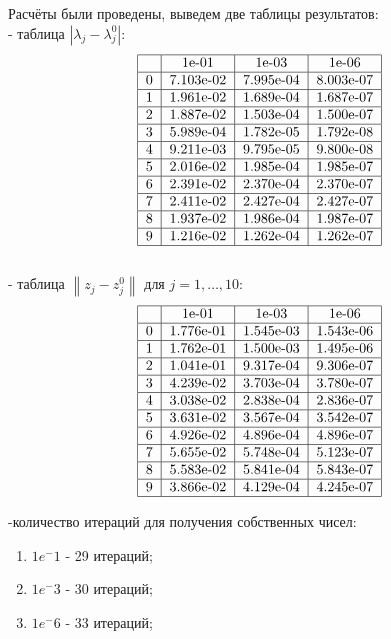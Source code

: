 \documentclass[a4paper]{article}
\begin{document}
\begin{small}

Расчёты были проведены, выведем две таблицы результатов: \\
- таблица $\left | \lambda_j - \lambda_j^{0}  \right |$:
\begin{equation*}
\begin{tabular}{|c|c|c|c|}
\hline
{} &      1e-01 &      1e-03 &      1e-06 \\
\hline
0 &  7.103e-02 &  7.995e-04 &  8.003e-07 \\
\hline
1 &  1.961e-02 &  1.689e-04 &  1.687e-07 \\
\hline
2 &  1.887e-02 &  1.503e-04 &  1.500e-07 \\
\hline
3 &  5.989e-04 &  1.782e-05 &  1.792e-08 \\
\hline
4 &  9.211e-03 &  9.795e-05 &  9.800e-08 \\
\hline
5 &  2.016e-02 &  1.985e-04 &  1.985e-07 \\
\hline
6 &  2.391e-02 &  2.370e-04 &  2.370e-07 \\
\hline
7 &  2.411e-02 &  2.427e-04 &  2.427e-07 \\
\hline
8 &  1.937e-02 &  1.986e-04 &  1.987e-07 \\
\hline
9 &  1.216e-02 &  1.262e-04 &  1.262e-07 \\
\hline
\end{tabular}
\end{equation*}
\\
- таблица $\left \| z_j - z_j^{0} \right \|$  для $j = 1,\ldots,10$:
\begin{equation*}
\begin{tabular}{|c|c|c|c|}
\hline
{} &      1e-01 &      1e-03 &      1e-06 \\
\hline
0 &  1.776e-01 &  1.545e-03 &  1.543e-06 \\
\hline
1 &  1.762e-01 &  1.500e-03 &  1.495e-06 \\
\hline
2 &  1.041e-01 &  9.317e-04 &  9.306e-07 \\
\hline
3 &  4.239e-02 &  3.703e-04 &  3.780e-07 \\
\hline
4 &  3.038e-02 &  2.838e-04 &  2.836e-07 \\
\hline
5 &  3.631e-02 &  3.567e-04 &  3.542e-07 \\
\hline
6 &  4.926e-02 &  4.896e-04 &  4.896e-07 \\
\hline
7 &  5.655e-02 &  5.748e-04 &  5.123e-07 \\
\hline
8 &  5.583e-02 &  5.841e-04 &  5.843e-07 \\
\hline
9 &  3.866e-02 &  4.129e-04 &  4.245e-07 \\
\hline
\end{tabular}
\end{equation*}

-количество итераций для получения собственных чисел:
\begin{enumerate}
\item $1e^-1$ - 29 итераций;
\item $1e^-3$ - 30 итераций;
\item $1e^-6$ - 33 итераций;
\end{enumerate}
\end{small}
\newpage
\end{document}
